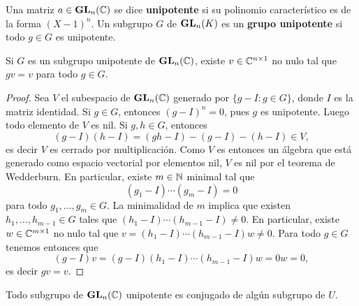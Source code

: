 Una matriz $a\in\mathbf{GL}_n(\mathbb{C})$ se dice \textbf{unipotente} si su polinomio característico es de la forma $(X-1)^n$. Un subgrupo
$G$ de $\mathbf{GL}_n(K)$ es un \textbf{grupo unipotente} si todo $g\in G$ es unipotente.  

\begin{proposition}
	Si $G$ es un subgrupo unipotente de $\mathbf{GL}_n(\mathbb{C})$, existe 
	$v\in \mathbb{C}^{n\times 1}$ no nulo tal que $gv=v$ para todo $g\in G$.  
\end{proposition}

\begin{proof}
	Sea $V$ el subespacio de $\mathbf{GL}_n(\mathbb{C})$ generado por $\{g-I:g\in G\}$, 
	donde $I$ es la matriz identidad. Si $g\in G$, entonces
	$(g-I)^n=0$, pues $g$ es unipotente. Luego todo elemento de $V$ es nil. 
	Si $g,h\in G$, entonces
	\[
	(g-I)(h-I)=(gh-I)-(g-I)-(h-I)\in V, 
	\]
	es decir $V$ es cerrado por multiplicación. Como $V$ es entonces un álgebra que 
	está generado como espacio
	vectorial por elementos nil, $V$ es nil por el teorema de Wedderburn. En particular,
	existe $m\in\mathbb{N}$ minimal tal que 
	\[
	(g_1-I)\cdots (g_m-I)=0
	\]
	para todo $g_1,\dots,g_m\in G$. 
	La minimalidad de $m$ implica que existen $h_1,\dots,h_{m-1}\in G$ tales que 
	$(h_1-I)\cdots (h_{m-1}-I)\ne 0$. En particular, existe $w\in \mathbb{C}^{m\times 1}$ no nulo tal que
	$v=(h_1-I)\cdots (h_{m-1}-I)w\ne 0$. Para todo $g\in G$ tenemos entonces
	que \[
	(g-I)v=(g-I)(h_1-I)\cdots (h_{m-1}-I)w=0w=0,
	\]
	es decir 
	$gv=v$. 
\end{proof}

\begin{theorem}[Kolchin]
Todo subgrupo de $\mathbf{GL}_n(\mathbb{C})$ unipotente es conjugado de algún subgrupo de $U$.	
\end{theorem}

